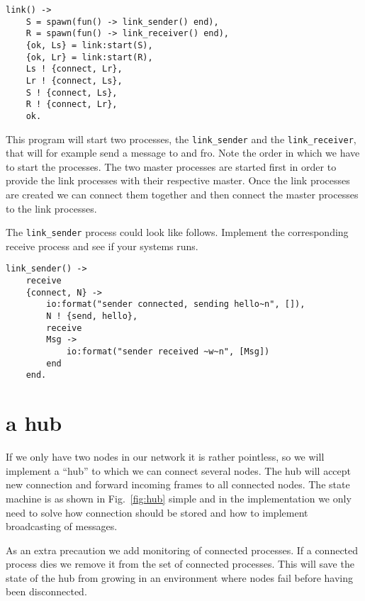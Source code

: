 \documentclass[a4paper,11pt]{article}
\begin{document}
\begin{lstlisting}
link() ->
    S = spawn(fun() -> link_sender() end),
    R = spawn(fun() -> link_receiver() end),
    {ok, Ls} = link:start(S),
    {ok, Lr} = link:start(R),
    Ls ! {connect, Lr},
    Lr ! {connect, Ls},    
    S ! {connect, Ls},
    R ! {connect, Lr},
    ok.
\end{lstlisting}  

This program will start two processes, the {\tt link\_sender} and the
{\tt link\_receiver}, that will for example send a message to and fro.
Note the order in which we have to start the processes. The two master
processes are started first in order to provide the link processes
with their respective master. Once the link processes are created we
can connect them together and then connect the master processes to the
link processes.

The {\tt link\_sender} process could look like follows. Implement the
corresponding receive process and see if your systems runs.


\begin{lstlisting}
link_sender() ->
    receive
	{connect, N} ->
	    io:format("sender connected, sending hello~n", []),
	    N ! {send, hello},
	    receive
		Msg ->
		    io:format("sender received ~w~n", [Msg])
	    end
    end.
\end{lstlisting}

\section{a hub}

If we only have two nodes in our network it is rather pointless, so we
will implement a ``hub'' to which we can connect several nodes. The hub
will accept new connection and forward incoming frames to all
connected nodes. The state machine is as shown in Fig.~\ref{fig:hub}
simple and in the implementation we only need to solve how connection
should be stored and how to implement broadcasting of messages.

As an extra precaution we add monitoring of connected processes. If a
connected process dies we remove it from the set of connected
processes. This will save the state of the hub from growing in an
environment where nodes fail before having been disconnected.
\end{document}
